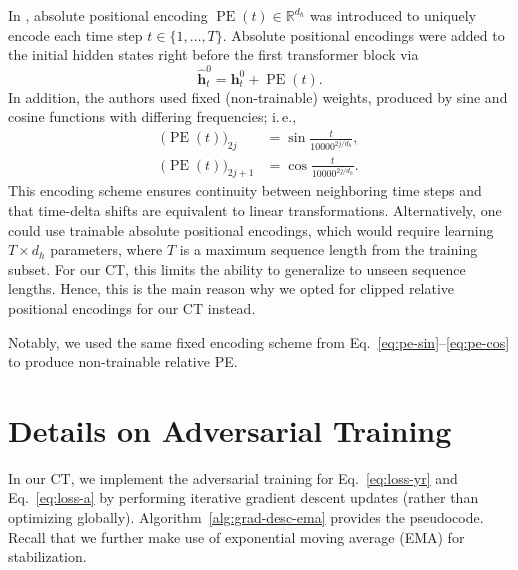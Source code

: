 \documentclass{article}
\newcommand\ie{i.\,e.\xspace}
\theoremstyle{plain}
\theoremstyle{definition}
\theoremstyle{remark}
\newcommand{\shortname}{CT\xspace}
\begin{document}
In \cite{vaswani2017attention}, absolute positional encoding $\operatorname{PE}(t) \in \mathbb{R}^{d_h}$ was introduced to uniquely encode each time step $t \in \{1, \dots, T\}$. Absolute positional encodings were added to the initial hidden states right before the first transformer block via
\begin{equation}
    \hat{\mathbf{h}}_t^0 = \mathbf{h}_t^0 + \operatorname{PE}(t) .
\end{equation}
In addition, the authors used fixed (non-trainable) weights, produced by sine and cosine functions with differing frequencies; \ie, 
\begin{align}
    \label{eq:pe-sin}
    \big(\operatorname{PE}(t)\big)_{2j} & = \sin{\frac{t}{10000^{2j/d_h}}} , \\
    \label{eq:pe-cos}
    \big(\operatorname{PE}(t)\big)_{2j + 1} & = \cos{\frac{t}{10000^{2j/d_h}}} .
\end{align}
This encoding scheme ensures continuity between neighboring time steps and that time-delta shifts are equivalent to linear transformations. Alternatively, one could use trainable absolute positional encodings, which would require learning $T \times d_h$ parameters, where $T$ is a maximum sequence length from the training subset. For our \shortname, this limits the ability to generalize to unseen sequence lengths. Hence, this is the main reason why we opted for clipped relative positional encodings for our \shortname instead.

Notably, we used the same fixed encoding scheme from Eq.~\eqref{eq:pe-sin}--\eqref{eq:pe-cos} to produce non-trainable relative PE. 

\clearpage
\section{Details on Adversarial Training} \label{app:adv-training}

In our \shortname, we implement the adversarial training for Eq.~\eqref{eq:loss-yr} and Eq.~\eqref{eq:loss-a} by performing iterative gradient descent updates (rather than optimizing globally). Algorithm~\ref{alg:grad-desc-ema} provides the pseudocode. Recall that we further make use of exponential moving average (EMA) for stabilization. 
\end{document}
